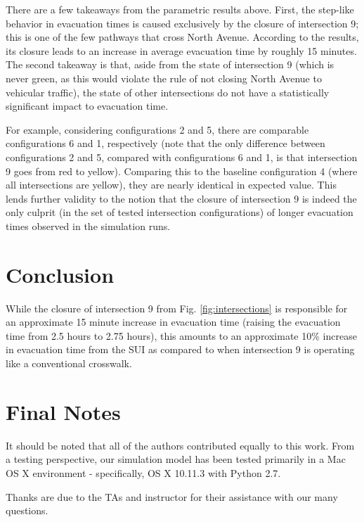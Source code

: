 \documentclass[12pt]{article}
\begin{document}
There are a few takeaways from the parametric results above.  First, the
step-like behavior in evacuation times is caused exclusively by the closure of
intersection 9; this is one of the few pathways that cross North Avenue.
According to the results, its closure leads to an increase in average evacuation
time by roughly 15 minutes.  The second takeaway is that, aside from the state
of intersection 9 (which is never green, as this would violate the rule of
not closing North Avenue to vehicular traffic), the state of other intersections
do not have a statistically significant impact to evacuation time.

For example, considering configurations 2 and 5, there are comparable
configurations 6 and 1, respectively (note that the only difference between
configurations 2 and 5, compared with configurations 6 and 1, is that intersection
9 goes from red to yellow).  Comparing this to the baseline configuration 4
(where all intersections are yellow), they are nearly identical in expected
value.  This lends further validity to the notion that the closure of intersection
9 is indeed the only culprit (in the set of tested intersection configurations)
of longer evacuation times observed in the simulation runs.

\section{Conclusion}
While the closure of intersection 9 from Fig. \ref{fig:intersections} is
responsible for an approximate 15 minute increase in evacuation time (raising
the evacuation time from 2.5 hours to 2.75 hours), this amounts to an
approximate 10\% increase in evacuation time from the SUI as compared to when
intersection 9 is operating like a conventional crosswalk.

\section{Final Notes}
It should be noted that all of the authors contributed equally to this work.
From a testing perspective, our simulation model has been tested primarily in
a Mac OS X environment - specifically, OS X 10.11.3 with Python 2.7.

Thanks are due to the TAs and instructor for their assistance with our many
questions.

\clearpage
{}

\end{document}
